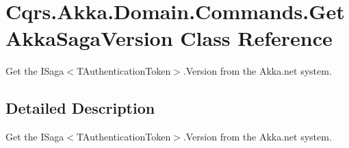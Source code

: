 \hypertarget{classCqrs_1_1Akka_1_1Domain_1_1Commands_1_1GetAkkaSagaVersion}{}\section{Cqrs.\+Akka.\+Domain.\+Commands.\+Get\+Akka\+Saga\+Version Class Reference}
\label{classCqrs_1_1Akka_1_1Domain_1_1Commands_1_1GetAkkaSagaVersion}


Get the I\+Saga$<$\+T\+Authentication\+Token$>$.\+Version from the Akka.\+net system.  




\subsection{Detailed Description}
Get the I\+Saga$<$\+T\+Authentication\+Token$>$.\+Version from the Akka.\+net system. 

